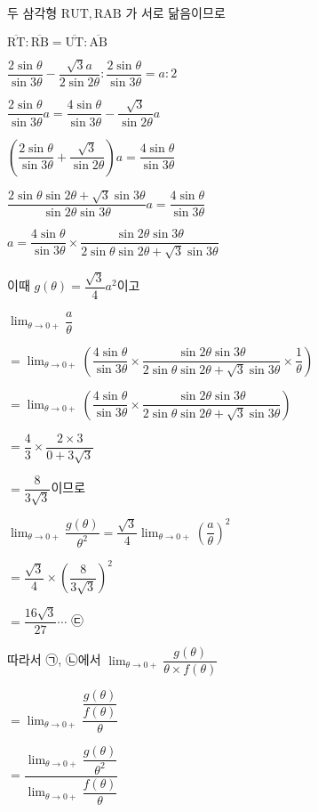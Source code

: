 \documentclass{oblivoir}
\begin{document}
두 삼각형 $\mathrm{RUT}, \mathrm{RAB}$ 가 서로 닮음이므로

$\overline{\mathrm{RT}}: \overline{\mathrm{RB}}=\overline{\mathrm{UT}}: \overline{\mathrm{AB}}$

$\dfrac{2 \sin \theta}{\sin 3 \theta}-\dfrac{\sqrt{3} a}{2 \sin 2 \theta}: \dfrac{2 \sin \theta}{\sin 3 \theta}=a: 2$

$\dfrac{2 \sin \theta}{\sin 3 \theta} a=\dfrac{4 \sin \theta}{\sin 3 \theta}-\dfrac{\sqrt{3}}{\sin 2 \theta} a$

$\left(\dfrac{2 \sin \theta}{\sin 3 \theta}+\dfrac{\sqrt{3}}{\sin 2 \theta}\right) a=\dfrac{4 \sin \theta}{\sin 3 \theta}$

$\dfrac{2 \sin \theta \sin 2 \theta+\sqrt{3} \sin 3 \theta}{\sin 2 \theta \sin 3 \theta} a=\dfrac{4 \sin \theta}{\sin 3 \theta}$

$a=\dfrac{4 \sin \theta}{\sin 3 \theta} \times \dfrac{\sin 2 \theta \sin 3 \theta}{2 \sin \theta \sin 2 \theta+\sqrt{3} \sin 3 \theta}$

이때
$g(\theta)=\dfrac{\sqrt{3}}{4} a^{2}$이고

$\displaystyle\lim _{\theta \rightarrow 0+} \dfrac{a}{\theta}$

$=\displaystyle\lim _{\theta \rightarrow 0+}\left(\dfrac{4 \sin \theta}{\sin 3 \theta} \times \dfrac{\sin 2 \theta \sin 3 \theta}{2 \sin \theta \sin 2 \theta+\sqrt{3} \sin 3 \theta} \times \dfrac{1}{\theta}\right)$

$=\displaystyle\lim _{\theta \rightarrow 0+}\left(\dfrac{4 \sin \theta}{\sin 3 \theta} \times \dfrac{\sin 2 \theta \sin 3 \theta}{2 \sin \theta \sin 2 \theta+\sqrt{3} \sin 3 \theta}\right)$

$=\dfrac{4}{3} \times \dfrac{2 \times 3}{0+3 \sqrt{3}}$

$=\dfrac{8}{3 \sqrt{3}}$이므로

$\displaystyle\lim _{\theta \rightarrow 0+} \dfrac{g(\theta)}{\theta^{2}}=\dfrac{\sqrt{3}}{4} \displaystyle\lim _{\theta \rightarrow 0+}\left(\dfrac{a}{\theta}\right)^{2}$

$=\dfrac{\sqrt{3}}{4} \times\left(\dfrac{8}{3 \sqrt{3}}\right)^{2}$

$=\dfrac{16 \sqrt{3}}{27} \cdots$ ㉢

따라서 ㉠, ㉡에서
$\displaystyle\lim _{\theta \rightarrow 0+} \dfrac{g(\theta)}{\theta \times f(\theta)}$

$=\displaystyle\lim _{\theta \rightarrow 0+} \dfrac{\dfrac{g(\theta)}{f(\theta)}}{\theta}$

$=\dfrac{\displaystyle\lim _{\theta \rightarrow 0+} \dfrac{g(\theta)}{\theta^{2}}}{\displaystyle\lim _{\theta \rightarrow 0+} \dfrac{f(\theta)}{\theta}}$
\end{document}
